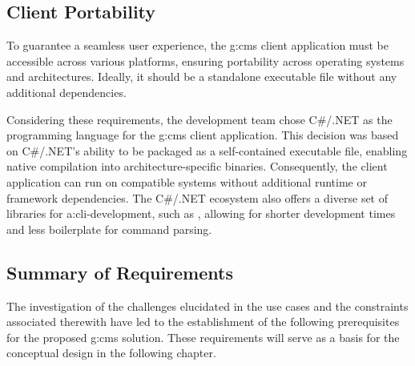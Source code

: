 \subsection{Client Portability}\label{sec:req-client-portability}

To guarantee a seamless user experience, the \gls{g:cms} client application must be accessible across various platforms, ensuring portability across operating systems and architectures. Ideally, it should be a standalone executable file without any additional dependencies.

Considering these requirements, the development team chose C\#/.NET as the programming language for the \gls{g:cms} client application. This decision was based on C\#/.NET's ability to be packaged as a self-contained executable file, enabling native compilation into architecture-specific binaries. Consequently, the client application can run on compatible systems without additional runtime or framework dependencies. The C\#/.NET ecosystem also offers a diverse set of libraries for \gls{a:cli}-development, such as , allowing for shorter development times and less boilerplate for command parsing.

\pagebreak

\subsection{Summary of Requirements}
\label{sec:requirements-summary}

The investigation of the challenges elucidated in the use cases and the constraints associated therewith have led to the establishment of the following prerequisites for the proposed \gls{g:cms} solution. These requirements will serve as a basis for the conceptual design in the following chapter.

